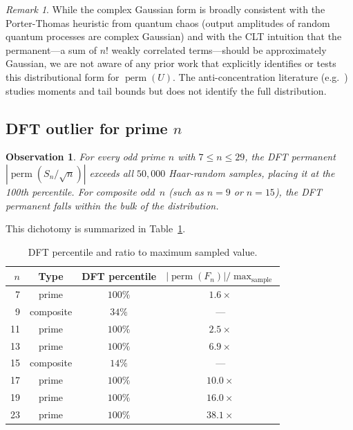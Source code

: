 \documentclass[11pt]{amsart}
\newtheorem{observation}[theorem]{Observation}
\theoremstyle{definition}
\theoremstyle{remark}
\newtheorem{remark}[theorem]{Remark}
\DeclareMathOperator{\perm}{perm}
\begin{document}
\begin{remark}
While the complex Gaussian form is broadly consistent with the
Porter-Thomas heuristic from quantum chaos (output amplitudes of
random quantum processes are complex Gaussian) and with the CLT
intuition that the permanent---a sum of $n!$ weakly correlated
terms---should be approximately Gaussian, we are not aware of any
prior work that explicitly identifies or tests this distributional
form for $\perm(U)$.  The anti-concentration literature
(e.g.\ \cite{Nezami21,FeffermanGhoshZhan24}) studies moments and tail
bounds but does not identify the full distribution.
\end{remark}

\subsection{DFT outlier for prime $n$}

\begin{observation}\label{obs:dft}
For every odd prime $n$ with $7\le n\le 29$, the DFT permanent
$|\perm(S_n/\sqrt{n})|$ exceeds all $50{,}000$ Haar-random samples,
placing it at the 100th percentile.  For composite odd~$n$ (such as
$n=9$ or $n=15$), the DFT permanent falls within the bulk of the
distribution.
\end{observation}

This dichotomy is summarized in Table~\ref{tab:dft}.

\begin{table}[ht]
\centering
\caption{DFT percentile and ratio to maximum sampled value.}
\label{tab:dft}
\medskip
\begin{tabular}{rccc}
\toprule
$n$ & Type & DFT percentile & $|\perm(F_n)|/\max_{\text{sample}}$ \\
\midrule
7  & prime     & $100\%$ & $1.6\times$ \\
9  & composite & $34\%$ & --- \\
11 & prime     & $100\%$ & $2.5\times$ \\
13 & prime     & $100\%$ & $6.9\times$ \\
15 & composite & $14\%$ & --- \\
17 & prime     & $100\%$ & $10.0\times$ \\
19 & prime     & $100\%$ & $16.0\times$ \\
23 & prime     & $100\%$ & $38.1\times$ \\
\bottomrule
\end{tabular}
\end{table}
\end{document}
